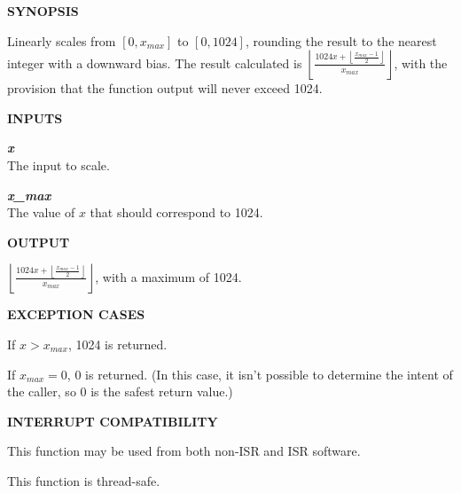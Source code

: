 \noindent\textbf{SYNOPSIS}
\begin{list}{}{\setlength{\leftmargin}{0.25in}\setlength{\topsep}{0.0in}}
\item Linearly scales from $[0, x_{max}]$ to $[0, 1024]$, rounding the result
      to the nearest integer with a downward bias.  The result calculated is
      $\displaystyle{\left\lfloor \frac{1024 x + \left\lfloor \displaystyle{\frac{x_{max} - 1}{2}} \right\rfloor}{x_{max}} \right\rfloor}$,
      with the provision that the function output will never exceed 1024.
\end{list}
\vspace{2.8ex}

\noindent\textbf{INPUTS}
\begin{list}{}{\setlength{\leftmargin}{0.5in}\setlength{\itemindent}{-0.25in}\setlength{\topsep}{0.0in}\setlength{\partopsep}{0.0in}}
\item \emph{\textbf{x}}\\
      The input to scale.
\item \emph{\textbf{x\_max}}\\
      The value of $x$ that should correspond to 1024.
\end{list}
\vspace{2.8ex}

\noindent\textbf{OUTPUT}
\begin{list}{}{\setlength{\leftmargin}{0.25in}\setlength{\topsep}{0.0in}}
\item $\displaystyle{\left\lfloor \frac{1024 x + \left\lfloor \displaystyle{\frac{x_{max} - 1}{2}} \right\rfloor}{x_{max}} \right\rfloor}$,
      with a maximum of 1024.
\end{list}
\vspace{2.8ex}

\noindent\textbf{EXCEPTION CASES}
\begin{list}{}{\setlength{\leftmargin}{0.25in}\setlength{\topsep}{0.0in}}
\item If $x>x_{max}$, 1024 is returned.
\item If $x_{max}=0$, 0 is returned.  (In this
      case, it isn't possible to determine the intent of
      the caller, so 0 is the safest return value.)
\end{list}
\vspace{2.8ex}

\noindent\textbf{INTERRUPT COMPATIBILITY}
\begin{list}{}{\setlength{\leftmargin}{0.25in}\setlength{\topsep}{0.0in}}
\item This function may be used from both non-ISR and ISR software.
\item This function is thread-safe.
\end{list}
\vspace{2.8ex}

